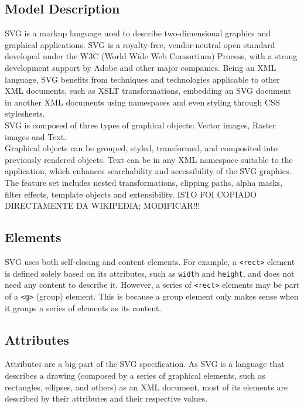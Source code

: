 \documentclass[twocolumn,twoside,10pt,a4paper]{article}
\begin{document}
\subsection{Model Description}

SVG is a markup language used to describe two-dimensional graphics and graphical applications. SVG is a royalty-free, vendor-neutral open standard developed under the W3C (World Wide Web Consortium) Process, with a strong development support by Adobe and other major companies.
Being an XML language, SVG benefits from techniques and technologies applicable to other XML documents, such as XSLT transformations, embedding an SVG document in another XML documents using namespaces and even styling through CSS stylesheets.\\

SVG is composed of three types of graphical objects: Vector images, Raster images and Text.\\

Graphical objects can be grouped, styled, transformed, and composited into previously rendered objects. Text can be in any XML namespace suitable to the application, which enhances searchability and accessibility of the SVG graphics. The feature set includes nested transformations, clipping paths, alpha masks, filter effects, template objects and extensibility. ISTO FOI COPIADO DIRECTAMENTE DA WIKIPEDIA; MODIFICAR!!!

\subsection{Elements}

SVG uses both self-closing and content elements. For example, a \verb!<rect>! element is defined solely based on its attributes, such as \verb!width! and \verb!height!, and does not need any content to describe it. However, a series of \verb!<rect>! elements may be part of a \verb!<g>! (group) element. This is because a group element only makes sense when it groups a series of elements as its content.


\subsection{Attributes}

Attributes are a big part of the SVG specification. As SVG is a language that describes a drawing (composed by a series of graphical elements, such as rectangles, ellipses, and others) as an XML document, most of its elements are described by their attributes and their respective values.
\end{document}
